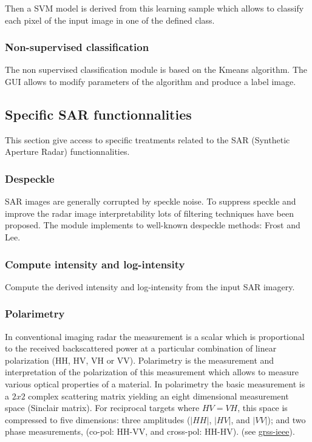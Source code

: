 Then a SVM model is derived from this learning sample which allows to
classify each pixel of the input image in one of the defined class.


\subsubsection{Non-supervised classification}
The non supervised classification module is based on the Kmeans
algorithm.  The GUI allows to modify parameters of the algorithm and
produce a label image.

\subsection{Specific SAR functionnalities}
This section give access to specific treatments related to the SAR
(Synthetic Aperture Radar) functionnalities.

\subsubsection{Despeckle}
SAR images are generally corrupted by speckle noise. To suppress 
speckle and improve the radar image interpretability lots of filtering 
techniques have been proposed.  The module implements to well-known 
despeckle methods: Frost and Lee.

\subsubsection{Compute intensity and log-intensity}
Compute the derived intensity and log-intensity from the input SAR imagery.

\subsubsection{Polarimetry}
In conventional imaging radar the measurement is a scalar which is 
proportional to the received backscattered power at a particular combination 
of linear polarization (HH, HV, VH or VV). 
Polarimetry is the measurement and interpretation of the polarization of this measurement which
allows to measure various optical properties of a material.
In polarimetry the basic measurement is a $2x2$ complex scattering
matrix yielding an eight dimensional measurement space (Sinclair
matrix). For reciprocal targets where $HV=VH$, this space is
compressed to five dimensions: three amplitudes ($|HH|$, $|HV|$, and
$|VV|$); and two phase measurements, (co-pol: HH-VV, and cross-pol:
HH-HV). (see 
\href{http://www.grss-ieee.org/technical-briefs/imaging-radar-polarimetry}{grss-ieee}).
 
